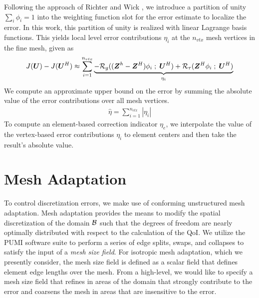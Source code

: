 Following the approach of Richter and Wick \cite{richter2015variational}, we
introduce a partition of unity $\sum_i \phi_i = 1$ into the weighting
function slot for the error estimate to localize the error. In this work,
this partition of unity is realized with linear Lagrange basis functions.
This yields local level error contributions $\eta_i$ at the $n_{vtx}$
mesh vertices in the fine mesh, given as
%
\begin{gather}
J(\boldsymbol{U}) - J(\boldsymbol{U}^H) \approx
\sum_{i=1}^{n_{vtx}}
\underbrace{
- \mathcal{R}_g ( (\boldsymbol{Z}^h - \boldsymbol{Z}^H) \phi_i \; ; \; \boldsymbol{U}^H ) +
\mathcal{R}_{\tau} ( \boldsymbol{Z}^H \phi_i \; ; \; \boldsymbol{U}^H )
}_{\eta_i}
\label{eq:mech_error_localization}
\end{gather}
%
We compute an approximate upper bound on the error by summing the absolute
value of the error contributions over all mesh vertices.
%
\begin{gather}
\hat{\eta} = \sum_{i=1}^{n_{vtx}} | \eta_i |
\label{eq:mech_approximated_bound}
\end{gather}
%
To compute an element-based correction indicator $\eta_e$, we interpolate the
value of the vertex-based error contributions $\eta_i$ to element centers
and then take the result's absolute value.

\section{Mesh Adaptation}

To control discretization errors, we make use of conforming unstructured
mesh adaptation. Mesh adaptation provides the means to modify the spatial
discretization of the domain $\mathcal{B}$ such that the degrees of freedom are nearly
optimally distributed with respect to the calculation of the QoI.
We utilize the PUMI \cite{ibanez2016pumi} software suite to perform a series
of edge splits, swaps, and collapses \cite{li20053d, alauzet2006parallel} to
satisfy the input of a \emph{mesh size field}. For isotropic mesh adaptation,
which we presently consider, the mesh size field is defined as a scalar field
that defines element edge lengths over the mesh. From a high-level, we would
like to specify a mesh size field that refines in areas of the domain that
strongly contribute to the error and coarsens the mesh in areas that are
insensitive to the error.


